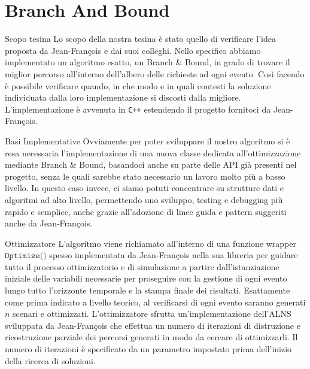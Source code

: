 \documentclass[10pt]{beamer}
\begin{document}
    \section{Branch And Bound}\label{sec:branch-and-bound}
    \begin{frame}{Scopo tesina}
        Lo scopo della nostra tesina è stato quello di verificare l'idea proposta da Jean-François e dai suoi colleghi. Nello specifico abbiamo implementato un algoritmo esatto, un Branch \& Bound, in grado di trovare il miglior percorso all'interno dell'albero delle richieste ad ogni evento. Così facendo è possibile verificare quando, in che modo e in quali contesti la soluzione individuata dalla loro implementazione si discosti dalla migliore. L'implementazione è avvenuta in \texttt{C++} estendendo il progetto fornitoci da Jean-François.
    \end{frame}

    \begin{frame}{Basi Implementative}
        Ovviamente per poter sviluppare il nostro algoritmo si è resa necessaria l'implementazione di una nuova classe dedicata all'ottimizzazione mediante Branch \& Bound, basandoci anche su parte delle API già presenti nel progetto, senza le quali sarebbe stato necessario un lavoro molto più a basso livello. In questo caso invece, ci siamo potuti concentrare su strutture dati e algoritmi ad alto livello, permettendo uno sviluppo, testing e debugging più rapido e semplice, anche grazie all'adozione di linee guida e pattern suggeriti anche da Jean-François.
    \end{frame}

    \begin{frame}{Ottimizzatore}
        L'algoritmo viene richiamato all'interno di una funzione wrapper $\texttt{Optimize()}$ spesso implementata da Jean-François nella sua libreria per guidare tutto il processo ottimizzatorio e di simulazione a partire dall'istanziazione iniziale delle variabili necessarie per proseguire con la gestione di ogni evento lungo tutto l'orizzonte temporale e la stampa finale dei risultati. Esattamente come prima indicato a livello teorico, al verificarsi di ogni evento saranno generati $n$ scenari e ottimizzati. L'ottimizzatore sfrutta un'implementazione dell'ALNS \cite{Ropke} sviluppata da Jean-François che effettua un numero di iterazioni di distruzione e ricostruzione parziale dei percorsi generati in modo da cercare di ottimizzarli. Il numero di iterazioni è specificato da un parametro impostato prima dell'inizio della ricerca di soluzioni.
    \end{frame}
\end{document}
